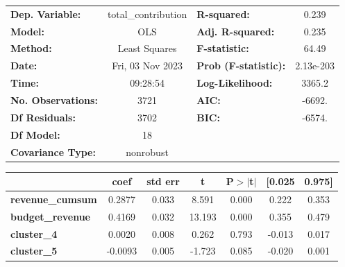 \begin{center}
\begin{tabular}{lclc}
\toprule
\textbf{Dep. Variable:}                     & total\_contribution & \textbf{  R-squared:         } &     0.239   \\
\textbf{Model:}                             &         OLS         & \textbf{  Adj. R-squared:    } &     0.235   \\
\textbf{Method:}                            &    Least Squares    & \textbf{  F-statistic:       } &     64.49   \\
\textbf{Date:}                              &   Fri, 03 Nov 2023  & \textbf{  Prob (F-statistic):} & 2.13e-203   \\
\textbf{Time:}                              &       09:28:54      & \textbf{  Log-Likelihood:    } &    3365.2   \\
\textbf{No. Observations:}                  &          3721       & \textbf{  AIC:               } &    -6692.   \\
\textbf{Df Residuals:}                      &          3702       & \textbf{  BIC:               } &    -6574.   \\
\textbf{Df Model:}                          &            18       & \textbf{                     } &             \\
\textbf{Covariance Type:}                   &      nonrobust      & \textbf{                     } &             \\
\bottomrule
\end{tabular}
\begin{tabular}{lcccccc}
                                            & \textbf{coef} & \textbf{std err} & \textbf{t} & \textbf{P$> |$t$|$} & \textbf{[0.025} & \textbf{0.975]}  \\
\midrule
\textbf{revenue\_cumsum}                    &       0.2877  &        0.033     &     8.591  &         0.000        &        0.222    &        0.353     \\
\textbf{budget\_revenue}                    &       0.4169  &        0.032     &    13.193  &         0.000        &        0.355    &        0.479     \\
\textbf{cluster\_4}                         &       0.0020  &        0.008     &     0.262  &         0.793        &       -0.013    &        0.017     \\
\textbf{cluster\_5}                         &      -0.0093  &        0.005     &    -1.723  &         0.085        &       -0.020    &        0.001     \\

\end{tabular}
\end{center}
